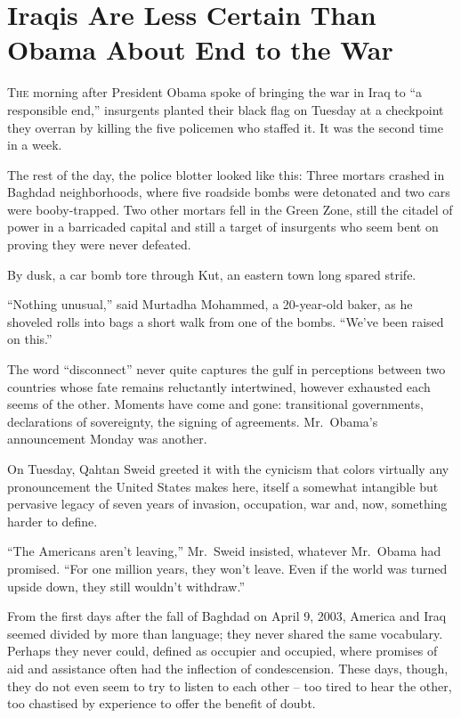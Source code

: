 ﻿\documentclass[12pt]{article}
\begin{document}
\section{Iraqis Are Less Certain Than Obama About End to the War}

\lettrine{T}{he} morning after President Obama spoke of bringing the war in
Iraq to ``a responsible end,'' insurgents planted their black flag on Tuesday at a checkpoint they
overran by killing the five policemen who staffed it. It was the second time in a week.

The rest of the day, the police blotter looked like this: Three mortars crashed in Baghdad
neighborhoods, where five roadside bombs were detonated and two cars were booby-trapped. Two other
mortars fell in the Green Zone, still the citadel of power in a barricaded capital and still a
target of insurgents who seem bent on proving they were never defeated.

By dusk, a car bomb tore through Kut, an eastern town long spared strife.

``Nothing unusual,'' said Murtadha Mohammed, a 20-year-old baker, as he shoveled rolls into bags a
short walk from one of the bombs. ``We've been raised on this.''

The word ``disconnect'' never quite captures the gulf in perceptions between two countries whose
fate remains reluctantly intertwined, however exhausted each seems of the other. Moments have come
and gone: transitional governments, declarations of sovereignty, the signing of agreements.
Mr.~Obama's announcement Monday was another.

On Tuesday, Qahtan Sweid greeted it with the cynicism that colors virtually any pronouncement the
United States makes here, itself a somewhat intangible but pervasive legacy of seven years of
invasion, occupation, war and, now, something harder to define.

``The Americans aren't leaving,'' Mr.~Sweid insisted, whatever Mr.~Obama had promised. ``For one
million years, they won't leave. Even if the world was turned upside down, they still wouldn't
withdraw.''

From the first days after the fall of Baghdad on April 9, 2003, America and Iraq seemed divided by
more than language; they never shared the same vocabulary. Perhaps they never could, defined as
occupier and occupied, where promises of aid and assistance often had the inflection of
condescension. These days, though, they do not even seem to try to listen to each other -- too tired
to hear the other, too chastised by experience to offer the benefit of doubt.
\end{document}
